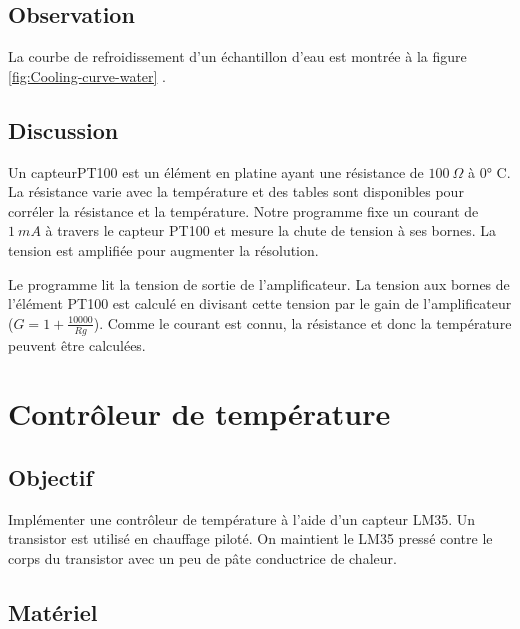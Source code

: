 \documentclass{book}
\begin{document}
\subsection{Observation}


La courbe de refroidissement d'un échantillon d'eau est montrée à la figure  \ref{fig:Cooling-curve-water} .

\subsection{Discussion}


Un capteurPT100 est un élément en platine ayant une résistance de $100\ \Omega$  à 0° C. La résistance varie avec la température et des tables sont disponibles pour corréler la résistance et la température. Notre programme fixe un courant de $1\ mA$ à travers le capteur PT100 et mesure la chute de tension à ses bornes. La tension est amplifiée pour augmenter la résolution.



Le programme lit la tension de sortie de l'amplificateur. La tension aux bornes de l'élément PT100 est calculé en divisant cette tension par le gain de l'amplificateur ($G=1+\frac{10000}{Rg}$). Comme le courant est connu, la résistance et donc la température peuvent être calculées.







\section{Contrôleur de température}



\subsection{Objectif}


Implémenter une contrôleur de température à l'aide d'un capteur LM35. Un transistor est utilisé en chauffage piloté. On maintient le LM35 pressé contre le corps du transistor avec un peu de pâte conductrice de chaleur.




\subsection{Matériel}
\end{document}
